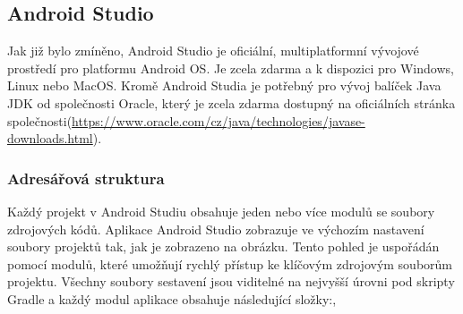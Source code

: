 \documentclass{vskpou} %
\begin{document}
\subsection{Android Studio}
Jak již bylo zmíněno, Android Studio je oficiální, multiplatformní vývojové prostředí pro platformu Android OS. Je zcela zdarma a k dispozici pro Windows, Linux nebo MacOS. Kromě Android Studia je potřebný pro vývoj balíček Java JDK od společnosti Oracle, který je zcela zdarma dostupný na oficiálních stránka společnosti(\url{https://www.oracle.com/cz/java/technologies/javase-downloads.html}). 

\subsubsection{Adresářová struktura}
Každý projekt v Android Studiu obsahuje jeden nebo více modulů se soubory zdrojových kódů. Aplikace Android Studio zobrazuje ve výchozím nastavení soubory projektů tak, jak je zobrazeno na obrázku. Tento pohled je uspořádán pomocí modulů, které umožňují rychlý přístup ke klíčovým zdrojovým souborům projektu. Všechny soubory sestavení jsou viditelné na nejvyšší úrovni pod skripty Gradle a každý modul aplikace obsahuje následující složky:\cite{1},\cite{17} 
\end{document}
